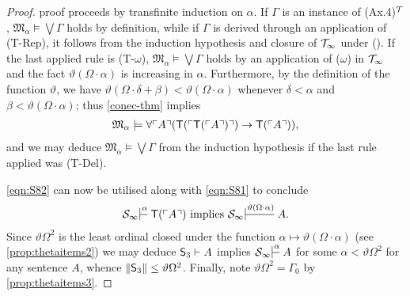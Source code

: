 \documentclass[UKenglish,cleveref,DIV=12]{scrartcl}
\theoremstyle{definition}
\theoremstyle{definition}
\begin{document}
\begin{proof}
proof proceeds by transfinite induction on $\alpha$. If $\Gamma$ is an instance
of (Ax.4)$^{\mathcal{T}}$, $\mathfrak{M}_\alpha\models\bigvee\Gamma$ holds by definition,
while if $\Gamma$ is derived through an application of (T-Rep), it follows from
the induction hypothesis and closure of $\mathcal{T}_\infty$ under (). If the last applied rule is (T-$\omega$), $\mathfrak{M}_\alpha\models\bigvee\Gamma$ holds by an application of
($\omega$) in $\mathcal{T}_\infty$ and the fact $\vartheta(\Omega\cdot\alpha)$ is increasing in $\alpha$.
Furthermore, by the definition of the function $\vartheta$, we have
$\vartheta(\Omega\cdot\delta+\beta)<\vartheta(\Omega\cdot\alpha)$ whenever
$\delta<\alpha$ and $\beta<\vartheta(\Omega\cdot\alpha)$; thus
\cref{conec-thm} implies
\begin{align*}
  \mathfrak{M}_\alpha\models\forall\ulcorner{A}\urcorner(\mathsf{T}(\ulcorner{\mathsf{T}(\ulcorner{A}\urcorner)}\urcorner)\rightarrow \mathsf{T}(\ulcorner{A}\urcorner)),
\end{align*}
and we may deduce $\mathfrak{M}_\alpha\models\bigvee\Gamma$ from the induction
hypothesis if the last rule applied was (T-Del).

\eqref{eqn:S82} can now be utilised along with \eqref{eqn:S81} to conclude
\begin{align*}%
 \theoryinf S\prv\alpha{}{\T(\gn A)}\text{ implies }\theoryinf
S\prv{\vartheta(\Omega\cdot\alpha)}{} {A.}
\end{align*}
Since $\vartheta\Omega^2$ is the least ordinal closed under the function
$\alpha\mapsto\vartheta(\Omega\cdot\alpha)$ (see \cref{prop:thetaitems2}) we
may deduce $\mathsf{S}_3\vdash A$ implies $\theoryinf S\prv\alpha{}A$ for
some $\alpha<\vartheta\Omega^2$ for any sentence $A$, whence $\lVert{\mathsf{S}_3}\rVert\le\vartheta\Omega^2$. Finally, note $\vartheta\Omega^2=\Gamma_0$
by \cref{prop:thetaitems3}.
\end{proof}
\end{document}

